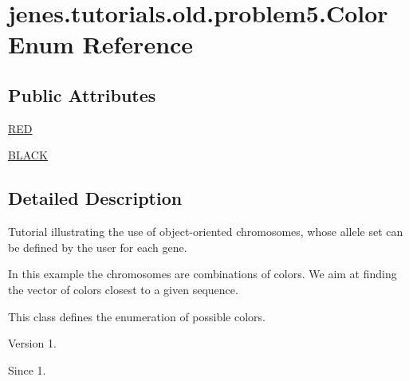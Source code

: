 \hypertarget{enumjenes_1_1tutorials_1_1old_1_1problem5_1_1_color}{\section{jenes.\-tutorials.\-old.\-problem5.\-Color Enum Reference}
\label{enumjenes_1_1tutorials_1_1old_1_1problem5_1_1_color}
}
\subsection*{Public Attributes}
\begin{DoxyCompactItemize}
\item 
\hyperlink{enumjenes_1_1tutorials_1_1old_1_1problem5_1_1_color_ad51840590e9a87bd4367c25e5022866b}{R\-E\-D}
\item 
\hyperlink{enumjenes_1_1tutorials_1_1old_1_1problem5_1_1_color_a8c48229adc1957d055626d3ce74bc22f}{B\-L\-A\-C\-K}
\end{DoxyCompactItemize}


\subsection{Detailed Description}
Tutorial illustrating the use of object-\/oriented chromosomes, whose allele set can be defined by the user for each gene.

In this example the chromosomes are combinations of colors. We aim at finding the vector of colors closest to a given sequence.

This class defines the enumeration of possible colors.

\begin{DoxyVersion}{Version}
1. 
\end{DoxyVersion}
\begin{DoxySince}{Since}
1. 
\end{DoxySince}


